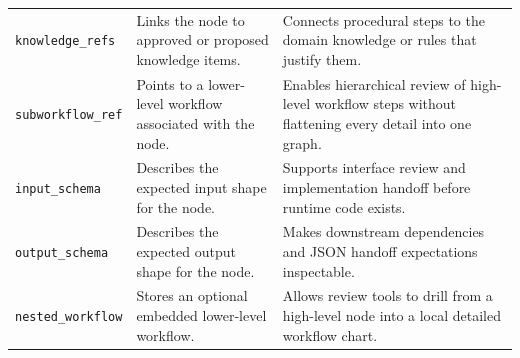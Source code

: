 \begin{table}[htbp]
\begin{tabular}{p{2.8cm} p{5.0cm} p{6.0cm}}
\texttt{knowledge\_refs} & Links the node to approved or proposed knowledge items. & Connects procedural steps to the domain knowledge or rules that justify them. \\
\texttt{subworkflow\_ref} & Points to a lower-level workflow associated with the node. & Enables hierarchical review of high-level workflow steps without flattening every detail into one graph. \\
\texttt{input\_schema} & Describes the expected input shape for the node. & Supports interface review and implementation handoff before runtime code exists. \\
\texttt{output\_schema} & Describes the expected output shape for the node. & Makes downstream dependencies and JSON handoff expectations inspectable. \\
\texttt{nested\_workflow} & Stores an optional embedded lower-level workflow. & Allows review tools to drill from a high-level node into a local detailed workflow chart. \\
\hline
\end{tabular}
\end{table}
